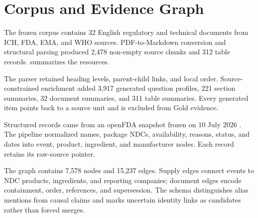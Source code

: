 \section{Corpus and Evidence Graph}
\label{sec:data}

The frozen corpus contains 32 English regulatory and technical documents from ICH, FDA, EMA, and WHO sources. PDF-to-Markdown conversion and structural parsing produced 2,478 non-empty source chunks and 312 table records.  summarizes the resources.



The parser retained heading levels, parent-child links, and local order. Source-constrained enrichment added 3,917 generated question profiles, 221 section summaries, 32 document summaries, and 311 table summaries. Every generated item points back to a source unit and is excluded from Gold evidence.

Structured records came from an openFDA snapshot frozen on 10 July 2026 \cite{openfdaShortages}. The pipeline normalized names, package NDCs, availability, reasons, status, and dates into event, product, ingredient, and manufacturer nodes. Each record retains its raw-source pointer.

The graph contains 7,578 nodes and 15,237 edges. Supply edges connect events to NDC products, ingredients, and reporting companies; document edges encode containment, order, references, and supersession. The schema distinguishes alias mentions from causal claims and marks uncertain identity links as candidates rather than forced merges.
